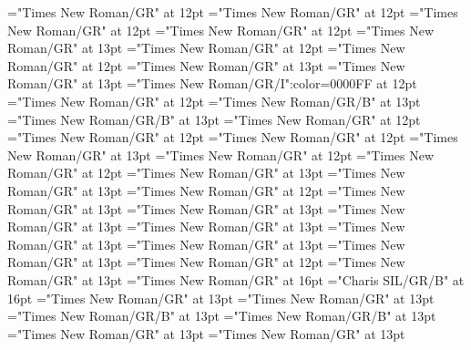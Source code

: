 \documentclass[a4paper]{article}
\begin{document}
\pagestyle{plain}
\sloppy
\setlength{\parfillskip}{0pt plus 1fil}
\font\xitemhi="Times New Roman/GR" at 12pt
\font\xitemte="Times New Roman/GR" at 12pt
\font\xitemxitemCmPossibilitypublishStemTransTypeAbbreviationPubbefore="Times New Roman/GR" at 12pt
\font\xitemxitemcomplexformrefsbefore="Times New Roman/GR" at 12pt
\font\xitemxitemdefinitionbefore="Times New Roman/GR" at 13pt
\font\xitemxitemdefinitionLcbefore="Times New Roman/GR" at 12pt
\font\xitemxitemdefinitionLdbefore="Times New Roman/GR" at 12pt
\font\xitemxitementryrefcomponentbefore="Times New Roman/GR" at 13pt
\font\xitemxitementryreftypebefore="Times New Roman/GR" at 13pt
\font\xitemxitemexamplebefore="Times New Roman/GR/I":color=0000FF at 12pt
\font\xitemxitemexamplesbefore="Times New Roman/GR" at 12pt
\font\xitemxitemheadwordbefore="Times New Roman/GR/B" at 13pt
\font\xitemxitemLexEntrypublishStemComponentTargetHeadWordRefbefore="Times New Roman/GR/B" at 13pt
\font\xitemxitemLexSensepublishStemDefinitionPubbefore="Times New Roman/GR" at 12pt
\font\xitemxitemLexSensepublishStemDefinitionPubLdbefore="Times New Roman/GR" at 12pt
\font\xitemxitemprimaryrefsbefore="Times New Roman/GR" at 12pt
\font\xitemxitempronunciationbefore="Times New Roman/GR" at 13pt
\font\xitemxitempronunciationsbefore="Times New Roman/GR" at 12pt
\font\xitemxitemsemanticdomainsbefore="Times New Roman/GR" at 12pt
\font\sensesensesensesbefore="Times New Roman/GR" at 13pt
\font\xitemxitemtranslationbefore="Times New Roman/GR" at 13pt
\font\xitemxitemtranslationLdbefore="Times New Roman/GR" at 12pt
\font\xitemxitemcrossrefbefore="Times New Roman/GR" at 13pt
\font\xitemxitemcrossreftargetsbefore="Times New Roman/GR" at 13pt
\font\xitemxitemcrossreftypebefore="Times New Roman/GR" at 13pt
\font\xitemxitemheadwordminorbefore="Times New Roman/GR" at 13pt
\font\xitemxitemmainentryrefbefore="Times New Roman/GR" at 13pt
\font\xitemxitemmainentryrefminorbefore="Times New Roman/GR" at 13pt
\font\xitemxitempronunciationminorbefore="Times New Roman/GR" at 13pt
\font\xitemxitemsensecrossrefbefore="Times New Roman/GR" at 12pt
\font\xitemxitemsensemainentryrefbefore="Times New Roman/GR" at 13pt
\font{}="Times New Roman/GR" at 16pt
\font{}="Charis SIL/GR/B" at 16pt
\font{}="Times New Roman/GR" at 13pt
\font\entryletDatadicBody="Times New Roman/GR" at 13pt
\font\headwordggoTeluINentryletDatadicBody="Times New Roman/GR/B" at 13pt
\font\spanenheadwordggoTeluINentryletDatadicBody="Times New Roman/GR/B" at 13pt
\font\pronunciationsentryletDatadicBody="Times New Roman/GR" at 13pt
\font\pronunciationggofonipaxemicpronunciationsentryletDatadicBody="Times New Roman/GR" at 13pt
\end{document}
